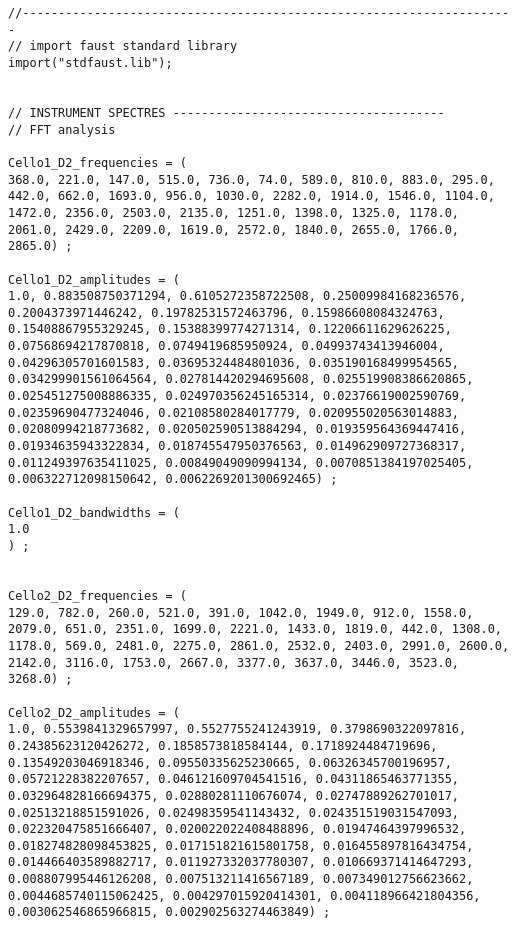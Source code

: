 \vspace{0.5cm}
\begin{lstlisting}
//---------------------------------------------------------------------
// import faust standard library
import("stdfaust.lib");


// INSTRUMENT SPECTRES --------------------------------------
// FFT analysis

Cello1_D2_frequencies = (
368.0, 221.0, 147.0, 515.0, 736.0, 74.0, 589.0, 810.0, 883.0, 295.0, 442.0, 662.0, 1693.0, 956.0, 1030.0, 2282.0, 1914.0, 1546.0, 1104.0, 1472.0, 2356.0, 2503.0, 2135.0, 1251.0, 1398.0, 1325.0, 1178.0, 2061.0, 2429.0, 2209.0, 1619.0, 2572.0, 1840.0, 2655.0, 1766.0, 2865.0) ; 
 
Cello1_D2_amplitudes = (
1.0, 0.883508750371294, 0.6105272358722508, 0.25009984168236576, 0.2004373971446242, 0.19782531572463796, 0.15986608084324763, 0.15408867955329245, 0.15388399774271314, 0.12206611629626225, 0.07568694217870818, 0.0749419685950924, 0.04993743413946004, 0.04296305701601583, 0.03695324484801036, 0.035190168499954565, 0.034299901561064564, 0.027814420294695608, 0.025519908386620865, 0.025451275008886335, 0.024970356245165314, 0.02376619002590769, 0.02359690477324046, 0.02108580284017779, 0.020955020563014883, 0.02080994218773682, 0.020502590513884294, 0.019359564369447416, 0.01934635943322834, 0.018745547950376563, 0.014962909727368317, 0.011249397635411025, 0.00849049090994134, 0.0070851384197025405, 0.006322712098150642, 0.0062269201300692465) ; 
 
Cello1_D2_bandwidths = (
1.0
) ; 


Cello2_D2_frequencies = (
129.0, 782.0, 260.0, 521.0, 391.0, 1042.0, 1949.0, 912.0, 1558.0, 2079.0, 651.0, 2351.0, 1699.0, 2221.0, 1433.0, 1819.0, 442.0, 1308.0, 1178.0, 569.0, 2481.0, 2275.0, 2861.0, 2532.0, 2403.0, 2991.0, 2600.0, 2142.0, 3116.0, 1753.0, 2667.0, 3377.0, 3637.0, 3446.0, 3523.0, 3268.0) ; 
 
Cello2_D2_amplitudes = (
1.0, 0.5539841329657997, 0.5527755241243919, 0.3798690322097816, 0.24385623120426272, 0.1858573818584144, 0.1718924484719696, 0.13549203046918346, 0.09550335625230665, 0.06326345700196957, 0.05721228382207657, 0.046121609704541516, 0.04311865463771355, 0.032964828166694375, 0.02880281110676074, 0.02747889262701017, 0.02513218851591026, 0.02498359541143432, 0.024351519031547093, 0.022320475851666407, 0.020022022408488896, 0.01947464397996532, 0.018274828098453825, 0.017151821615801758, 0.016455897816434754, 0.014466403589882717, 0.011927332037780307, 0.010669371414647293, 0.008807995446126208, 0.007513211416567189, 0.007349012756623662, 0.0044685740115062425, 0.004297015920414301, 0.004118966421804356, 0.003062546865966815, 0.002902563274463849) ; 
 

\end{lstlisting}
